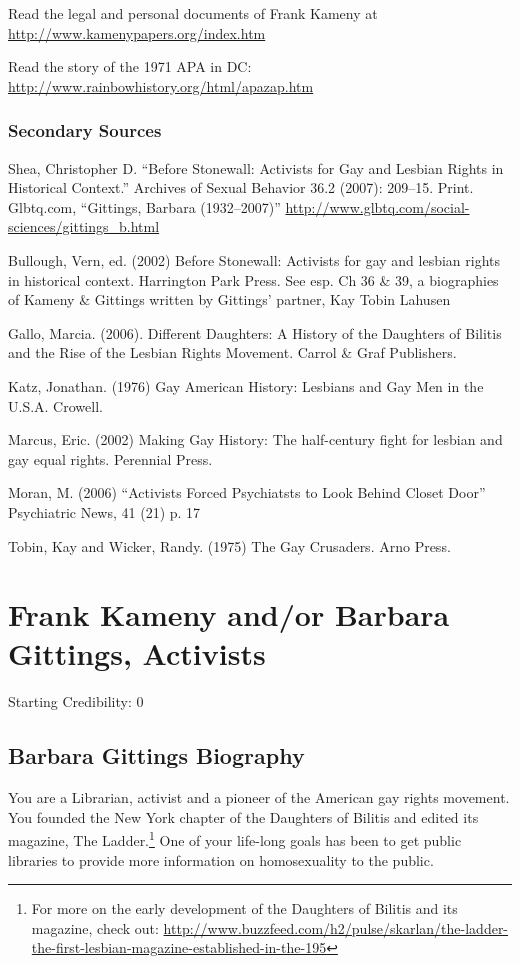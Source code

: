 \begin{refsection}
Read the legal and personal documents of Frank Kameny at \url{http://www.kamenypapers.org/index.htm}

Read the story of the 1971 APA in DC: \url{http://www.rainbowhistory.org/html/apazap.htm}

\subsection{Secondary Sources}
\label{secondarysources}

Shea, Christopher D. ``Before Stonewall: Activists for Gay and Lesbian Rights in Historical Context.'' Archives of Sexual Behavior 36.2 (2007): 209--15. Print.
Glbtq.com, “Gittings, Barbara (1932--2007)” \url{http://www.glbtq.com/social-sciences/gittings_b.html}

Bullough, Vern, ed. (2002) Before Stonewall: Activists for gay and lesbian rights in historical context. Harrington Park Press. See esp. Ch 36 \& 39, a biographies of Kameny \& Gittings written by Gittings' partner, Kay Tobin Lahusen

Gallo, Marcia. (2006). Different Daughters: A History of the Daughters of Bilitis and the Rise of the Lesbian Rights Movement. Carrol \& Graf Publishers.

Katz, Jonathan. (1976) Gay American History: Lesbians and Gay Men in the U.S.A. Crowell.

Marcus, Eric. (2002) Making Gay History: The half-century fight for lesbian and gay equal rights. Perennial Press.

Moran, M. (2006) “Activists Forced Psychiatsts to Look Behind Closet Door” Psychiatric News, 41 (21) p. 17

Tobin, Kay and Wicker, Randy. (1975) The Gay Crusaders. Arno Press.

\chapter{Frank Kameny and\slash or Barbara Gittings, Activists}
\label{frankkamenyandorbarbaragittingsactivists}

Starting Credibility: 0

\section{Barbara Gittings Biography}
\label{barbaragittingsbiography}

You are a Librarian, activist and a pioneer of the American gay rights movement. You founded the New York chapter of the Daughters of Bilitis and edited its magazine, The Ladder.\footnote{For more on the early development of the Daughters of Bilitis and its magazine, check out: \url{http://www.buzzfeed.com/h2/pulse/skarlan/the-ladder-the-first-lesbian-magazine-established-in-the-195}} One of your life-long goals has been to get public libraries to provide more information on homosexuality to the public.


\end{refsection}
